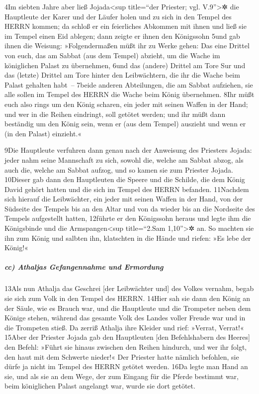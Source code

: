 4Im siebten Jahre aber ließ Jojada\textless sup title=``der Priester;
vgl. V.9''\textgreater✲ die Hauptleute der Karer und der Läufer holen
und zu sich in den Tempel des HERRN kommen; da schloß er ein feierliches
Abkommen mit ihnen und ließ sie im Tempel einen Eid ablegen; dann zeigte
er ihnen den Königssohn 5und gab ihnen die Weisung: »Folgendermaßen müßt
ihr zu Werke gehen: Das eine Drittel von euch, das am Sabbat (aus dem
Tempel) abzieht, um die Wache im königlichen Palast zu übernehmen, 6und
das (andere) Drittel am Tore Sur und das (letzte) Drittel am Tore hinter
den Leibwächtern, die ihr die Wache beim Palast gehalten habt~-- 7beide
anderen Abteilungen, die am Sabbat aufziehen, sie alle sollen im Tempel
des HERRN die Wache beim König übernehmen. 8Ihr müßt euch also rings um
den König scharen, ein jeder mit seinen Waffen in der Hand; und wer in
die Reihen eindringt, soll getötet werden; und ihr müßt dann beständig
um den König sein, wenn er (aus dem Tempel) auszieht und wenn er (in den
Palast) einzieht.«

9Die Hauptleute verfuhren dann genau nach der Anweisung des Priesters
Jojada: jeder nahm seine Mannschaft zu sich, sowohl die, welche am
Sabbat abzog, als auch die, welche am Sabbat aufzog, und so kamen sie
zum Priester Jojada. 10Dieser gab dann den Hauptleuten die Speere und
die Schilde, die dem König David gehört hatten und die sich im Tempel
des HERRN befanden. 11Nachdem sich hierauf die Leibwächter, ein jeder
mit seinen Waffen in der Hand, von der Südseite des Tempels bis an den
Altar und von da wieder bis an die Nordseite des Tempels aufgestellt
hatten, 12führte er den Königssohn heraus und legte ihm die Königsbinde
und die Armspangen\textless sup title=``2.Sam 1,10''\textgreater✲ an. So
machten sie ihn zum König und salbten ihn, klatschten in die Hände und
riefen: »Es lebe der König!«

\hypertarget{cc-athaljas-gefangennahme-und-ermordung}{%
\subparagraph{cc) Athaljas Gefangennahme und
Ermordung}\label{cc-athaljas-gefangennahme-und-ermordung}}

13Als nun Athalja das Geschrei {[}der Leibwächter und{]} des Volkes
vernahm, begab sie sich zum Volk in den Tempel des HERRN. 14Hier sah sie
dann den König an der Säule, wie es Brauch war, und die Hauptleute und
die Trompeter neben dem Könige stehen, während das gesamte Volk des
Landes voller Freude war und in die Trompeten stieß. Da zerriß Athalja
ihre Kleider und rief: »Verrat, Verrat!« 15Aber der Priester Jojada gab
den Hauptleuten {[}den Befehlshabern des Heeres{]} den Befehl: »Führt
sie hinaus zwischen den Reihen hindurch, und wer ihr folgt, den haut mit
dem Schwerte nieder!« Der Priester hatte nämlich befohlen, sie dürfe ja
nicht im Tempel des HERRN getötet werden. 16Da legte man Hand an sie,
und als sie an dem Wege, der zum Eingang für die Pferde bestimmt war,
beim königlichen Palast angelangt war, wurde sie dort getötet.

